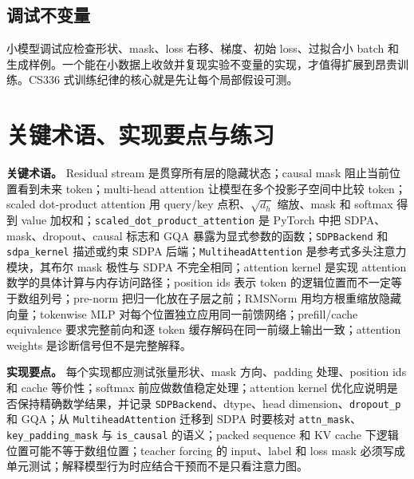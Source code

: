 \documentclass[UTF8,zihao=-4,openany]{ctexbook}
\begin{document}
\subsection{调试不变量}
小模型调试应检查形状、mask、loss 右移、梯度、初始 loss、过拟合小 batch 和生成样例。一个能在小数据上收敛并复现实验不变量的实现，才值得扩展到昂贵训练。CS336 式训练纪律的核心就是先让每个局部假设可测。

\section{关键术语、实现要点与练习}
\textbf{关键术语。} Residual stream 是贯穿所有层的隐藏状态；causal mask 阻止当前位置看到未来 token；multi-head attention 让模型在多个投影子空间中比较 token；scaled dot-product attention 用 query/key 点积、$\sqrt{d_h}$ 缩放、mask 和 softmax 得到 value 加权和；\texttt{scaled\_dot\_product\_attention} 是 PyTorch 中把 SDPA、mask、dropout、causal 标志和 GQA 暴露为显式参数的函数；\texttt{SDPBackend} 和 \texttt{sdpa\_kernel} 描述或约束 SDPA 后端；\texttt{MultiheadAttention} 是参考式多头注意力模块，其布尔 mask 极性与 SDPA 不完全相同；attention kernel 是实现 attention 数学的具体计算与内存访问路径；position ids 表示 token 的逻辑位置而不一定等于数组列号；pre-norm 把归一化放在子层之前；RMSNorm 用均方根重缩放隐藏向量；tokenwise MLP 对每个位置独立应用同一前馈网络；prefill/cache equivalence 要求完整前向和逐 token 缓存解码在同一前缀上输出一致；attention weights 是诊断信号但不是完整解释。

\textbf{实现要点。} 每个实现都应测试张量形状、mask 方向、padding 处理、position ids 和 cache 等价性；softmax 前应做数值稳定处理；attention kernel 优化应说明是否保持精确数学结果，并记录 \texttt{SDPBackend}、dtype、head dimension、\texttt{dropout\_p} 和 GQA；从 \texttt{MultiheadAttention} 迁移到 SDPA 时要核对 \texttt{attn\_mask}、\texttt{key\_padding\_mask} 与 \texttt{is\_causal} 的语义；packed sequence 和 KV cache 下逻辑位置可能不等于数组位置；teacher forcing 的 input、label 和 loss mask 必须写成单元测试；解释模型行为时应结合干预而不是只看注意力图。
\end{document}
